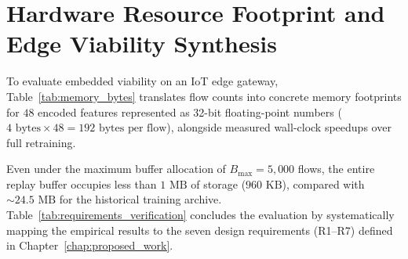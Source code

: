 \section{Hardware Resource Footprint and Edge Viability Synthesis}
\label{sec:resource_synthesis}

To evaluate embedded viability on an IoT edge gateway, Table~\ref{tab:memory_bytes} translates flow counts into concrete memory footprints for $48$ encoded features represented as 32-bit floating-point numbers ($4\text{ bytes} \times 48 = 192\text{ bytes per flow}$), alongside measured wall-clock speedups over full retraining.

\begin{table}[htbp]
\centering
\small
\setlength{\tabcolsep}{4.5pt}
\renewcommand{\arraystretch}{1.25}
\caption{Physical memory footprint and retraining speedup across update strategies}
\label{tab:memory_bytes}
\end{table}

Even under the maximum buffer allocation of $B_{\max} = 5{,}000$ flows, the entire replay buffer occupies less than $1\text{ MB}$ of storage ($960\text{ KB}$), compared with $\sim 24.5\text{ MB}$ for the historical training archive. Table~\ref{tab:requirements_verification} concludes the evaluation by systematically mapping the empirical results to the seven design requirements (R1--R7) defined in Chapter~\ref{chap:proposed_work}.


